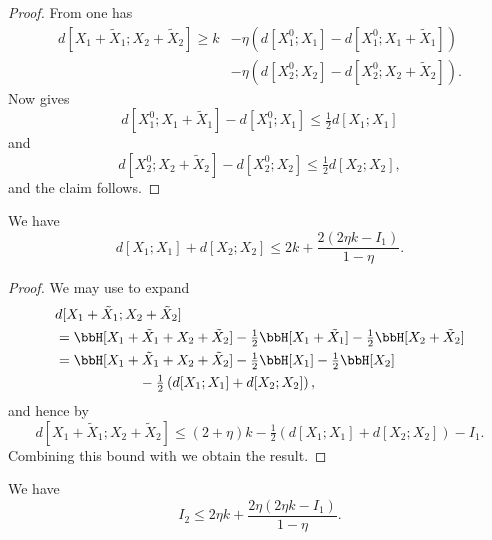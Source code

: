 \begin{proof}\leanok From  one has
\begin{align*}
    d[X_1+\tilde X_1; X_2+\tilde X_2] \geq k &- \eta(d[X^0_1;X_1] - d[X^0_1;X_1+\tilde X_1]) \\
    &- \eta(d[X^0_2;X_2] - d[X^0_2;X_2+\tilde X_2]).
\end{align*}
Now  gives
$$
d[X^0_1;X_1+\tilde X_1] - d[X^0_1;X_1] \leq \tfrac{1}{2} d[X_1;X_1]$$
and
$$
  d[X^0_2;X_2+\tilde X_2] - d[X^0_2;X_2] \leq \tfrac{1}{2} d[X_2;X_2],
$$
and the claim follows.
\end{proof}

\begin{lemma}\label{second-estimate-aux}\leanok
We have
\[d[X_1;X_1] + d[X_2;X_2] \leq 2 k + \frac{2(2 \eta k - I_1)}{1-\eta}. \]
\end{lemma}
\begin{proof}
\leanok
We may use  to expand
  \begin{align*}
   & d[X_1+\tilde X_1;X_2+\tilde X_2] \\ &= \bbH[X_1+\tilde X_1 + X_2 + \tilde X_2]  - \tfrac{1}{2} \bbH[X_1+\tilde X_1] - \tfrac{1}{2} \bbH[X_2+\tilde X_2] \\
    &= \bbH[X_1+\tilde X_1 + X_2 + \tilde X_2]  - \tfrac{1}{2} \bbH[X_1] - \tfrac{1}{2} \bbH[X_2]  \\ & \qquad\qquad\qquad   - \tfrac{1}{2} \left( d[X_1;X_1] + d[X_2; X_2] \right),
  \end{align*}
  and hence by 
  \[
    d[X_1+\tilde X_1; X_2+\tilde X_2] \leq (2+\eta) k - \tfrac{1}{2} \left( d[X_1;X_1] + d[X_2;X_2] \right) - I_1.
  \]
  Combining this bound with  we obtain
  the result.
\end{proof}

\begin{lemma}\label{second-estimate}
  \leanok
We have
$$ I_2 \leq 2 \eta k + \frac{2 \eta (2 \eta k - I_1)}{1 - \eta}.$$
\end{lemma}

